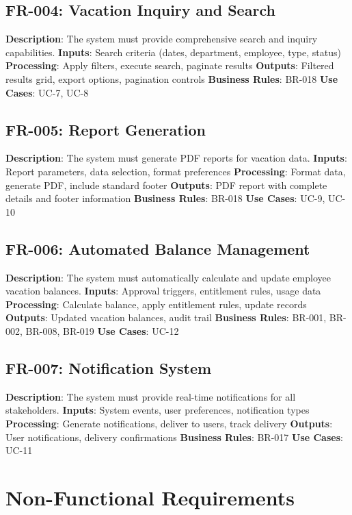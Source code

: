 \documentclass[12pt,a4paper]{article}
\begin{document}
\subsection{FR-004: Vacation Inquiry and Search}
\textbf{Description}: The system must provide comprehensive search and inquiry capabilities.
\textbf{Inputs}: Search criteria (dates, department, employee, type, status)
\textbf{Processing}: Apply filters, execute search, paginate results
\textbf{Outputs}: Filtered results grid, export options, pagination controls
\textbf{Business Rules}: BR-018
\textbf{Use Cases}: UC-7, UC-8

\subsection{FR-005: Report Generation}
\textbf{Description}: The system must generate PDF reports for vacation data.
\textbf{Inputs}: Report parameters, data selection, format preferences
\textbf{Processing}: Format data, generate PDF, include standard footer
\textbf{Outputs}: PDF report with complete details and footer information
\textbf{Business Rules}: BR-018
\textbf{Use Cases}: UC-9, UC-10

\subsection{FR-006: Automated Balance Management}
\textbf{Description}: The system must automatically calculate and update employee vacation balances.
\textbf{Inputs}: Approval triggers, entitlement rules, usage data
\textbf{Processing}: Calculate balance, apply entitlement rules, update records
\textbf{Outputs}: Updated vacation balances, audit trail
\textbf{Business Rules}: BR-001, BR-002, BR-008, BR-019
\textbf{Use Cases}: UC-12

\subsection{FR-007: Notification System}
\textbf{Description}: The system must provide real-time notifications for all stakeholders.
\textbf{Inputs}: System events, user preferences, notification types
\textbf{Processing}: Generate notifications, deliver to users, track delivery
\textbf{Outputs}: User notifications, delivery confirmations
\textbf{Business Rules}: BR-017
\textbf{Use Cases}: UC-11

\section{Non-Functional Requirements}
\end{document}
